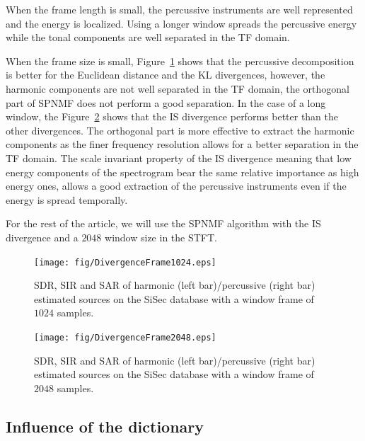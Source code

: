 When the frame length is small, the percussive instruments are well represented and the energy is localized. Using a longer window spreads the percussive energy while the tonal components are well separated in the TF domain.

When the frame size is small, Figure~\ref{frame1024} shows that the percussive decomposition is better for the Euclidean distance and the KL divergences, however, the harmonic components are not well separated in the TF domain, the orthogonal part of SPNMF does not perform a good separation.  
In the case of a long window, the Figure~\ref{frame2048} shows that the IS divergence performs better than the other divergences. The orthogonal part is more effective to extract the harmonic components as the finer frequency resolution allows for a better separation in the TF domain. The scale invariant property of the IS divergence meaning that low energy components of the spectrogram bear the same relative importance as high energy ones, allows a good extraction of the percussive instruments even if the energy is spread temporally.


For the rest of the article, we will use the SPNMF algorithm with the IS divergence and a $2048$ window size in the STFT.


\begin{figure}[htb]

  \centering 
  \texttt{[image: fig/DivergenceFrame1024.eps]}
  \caption{\label{frame1024} SDR, SIR and SAR of harmonic (left bar)/percussive (right bar) estimated sources on the SiSec database with a window frame of $1024$ samples.}
  
\end{figure}


\begin{figure}[htb]

  \centering 
  \texttt{[image: fig/DivergenceFrame2048.eps]}
  \caption{\label{frame2048} SDR, SIR and SAR of harmonic (left bar)/percussive (right bar) estimated sources on the SiSec database with a window frame of $2048$ samples.}
  
\end{figure}



\subsection{Influence of the dictionary}
\label{setup:dictionary}

